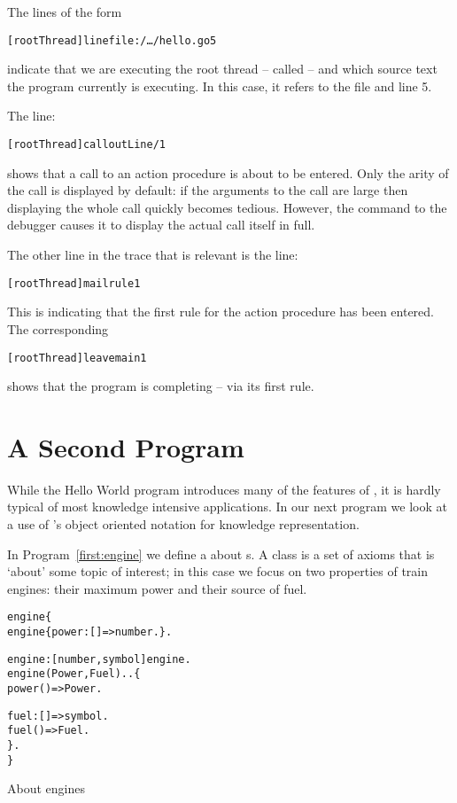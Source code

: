 The lines of the form
\begin{alltt}
[rootThread] line file:/\ldots/hello.go 5
\end{alltt}
indicate that we are executing the root thread -- called  -- and which source text the program currently is executing. In this case, it refers to the file  and line 5.

The line:
\begin{alltt}
[rootThread] call outLine/1
\end{alltt}
shows that a call to an action procedure  is about to be entered. Only the arity of the call is displayed by default: if the arguments to the call are large then displaying the whole call quickly becomes tedious. However, the  command to the debugger causes it to display the actual call itself in full.

The other line in the trace that is relevant is the  line:
\begin{alltt}
[rootThread] mail rule 1
\end{alltt}
This is indicating that the first rule for the  action procedure has been entered. The corresponding
\begin{alltt}
[rootThread] leave main 1
\end{alltt}
shows that the  program is completing -- via its first rule.



\chapter{A Second \go Program}
While the Hello World program introduces many of the features of \go, it is hardly typical of most knowledge intensive applications. In our next program we look at a use of \go's object oriented notation for knowledge representation.

In Program~\ref{first:engine} we define a  about s. A class is a set of axioms that is `about' some topic of interest; in this case we focus on two properties of train engines: their maximum power and their source of fuel.
\begin{program}
\vspace{0.5ex}
\begin{alltt}
engine\{
  engine \impl \{ power:[]=>number. \}.

  engine:[number,symbol]\conarrow{}engine.
  engine(Power,Fuel) .. \{
    power()=>Power.
    
    fuel:[]=>symbol.
    fuel()=>Fuel.
  \}.
\}
\end{alltt}
\vspace{-2ex}
\caption{About engines}
\label{first:engine}
\end{program}

